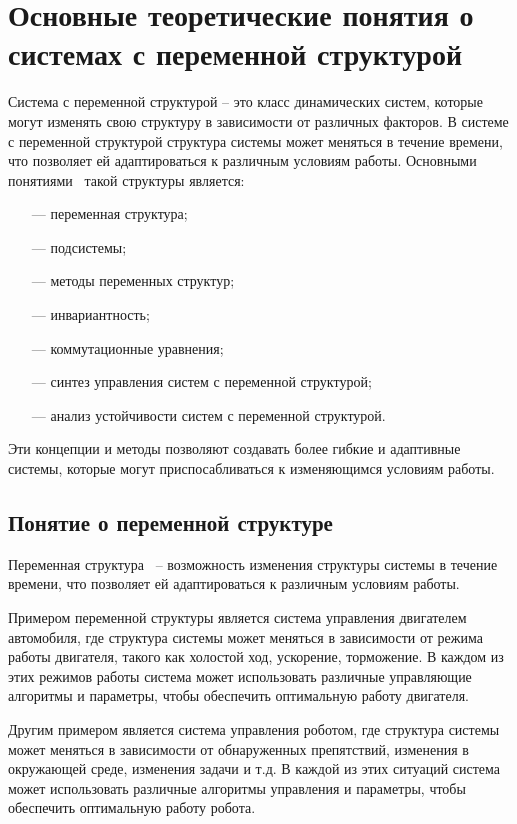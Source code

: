 \chapter{Основные теоретические понятия о системах с переменной структурой}

Система с переменной структурой -- это класс динамических систем, которые могут изменять свою структуру в зависимости от различных факторов. В системе с переменной структурой структура системы может меняться в течение времени, что позволяет ей адаптироваться к различным условиям работы. Основными понятиями~\cite{4} такой структуры является:
\begin{enumerate}
\item[—] переменная структура;
\item[—] подсистемы;
\item[—] методы переменных структур;
\item[—] инвариантность;
\item[—] коммутационные уравнения;
\item[—] синтез управления систем с переменной структурой;
\item[—] анализ устойчивости систем с переменной структурой.
\end{enumerate}

Эти концепции и методы позволяют создавать более гибкие и адаптивные системы, которые могут приспосабливаться к изменяющимся условиям работы.

\section{Понятие о переменной структуре}
Переменная структура~\cite{5} -- возможность изменения структуры системы в течение времени, что позволяет ей адаптироваться к различным условиям работы. 

Примером переменной структуры является система управления двигателем автомобиля, где структура системы может меняться в зависимости от режима работы двигателя, такого как холостой ход, ускорение, торможение. В каждом из этих режимов работы система может использовать различные управляющие алгоритмы и параметры, чтобы обеспечить оптимальную работу двигателя. 

Другим примером является система управления роботом, где структура системы может меняться в зависимости от обнаруженных препятствий, изменения в окружающей среде, изменения задачи и т.д. В каждой из этих ситуаций система может использовать различные алгоритмы управления и параметры, чтобы обеспечить оптимальную работу робота.

